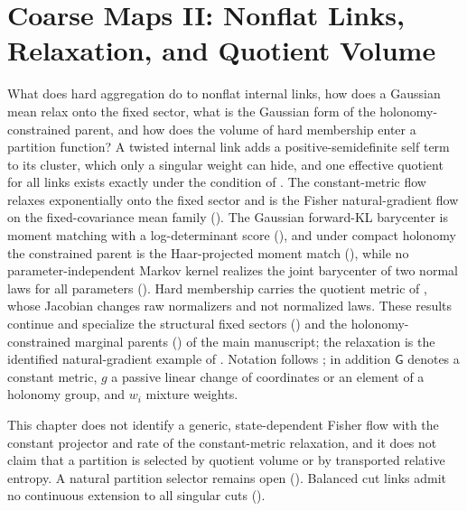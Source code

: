 \chapter[Coarse Maps II: Nonflat Links, Relaxation, and Quotient Volume]{Coarse Maps II: Nonflat Links,\\ Relaxation, and Quotient Volume}
\label{ch:gaussian-nonflat}

What does hard aggregation do to nonflat internal links, how does a Gaussian
mean relax onto the fixed sector, what is the Gaussian form of the
holonomy-constrained parent, and how does the volume of hard membership enter a
partition function? A twisted internal link adds a positive-semidefinite self
term to its cluster, which only a singular weight can hide, and one effective
quotient for all links exists exactly under the condition of
. The constant-metric flow relaxes
exponentially onto the fixed sector and is the Fisher natural-gradient flow on
the fixed-covariance mean family ().
The Gaussian forward-KL barycenter is moment matching with a log-determinant
score (), and under compact
holonomy the constrained parent is the Haar-projected moment match
(), while no parameter-independent
Markov kernel realizes the joint barycenter of two normal laws for all
parameters (). Hard membership carries the
quotient metric of , whose Jacobian changes raw
normalizers and not normalized laws. These results continue
 and specialize the structural fixed sectors
() and the holonomy-constrained marginal parents
() of the main manuscript; the relaxation is
the identified natural-gradient example of . Notation
follows ; in addition \(\mathsf G\) denotes a
constant metric, \(g\) a passive linear change of coordinates or an element of a
holonomy group, and \(w_i\) mixture weights.

This chapter does not identify a generic, state-dependent Fisher flow with the
constant projector and rate of the constant-metric relaxation, and it does not
claim that a partition is selected by quotient volume or by transported
relative entropy. A natural partition selector remains open
().  Balanced cut links admit no continuous
extension to all singular cuts ().

